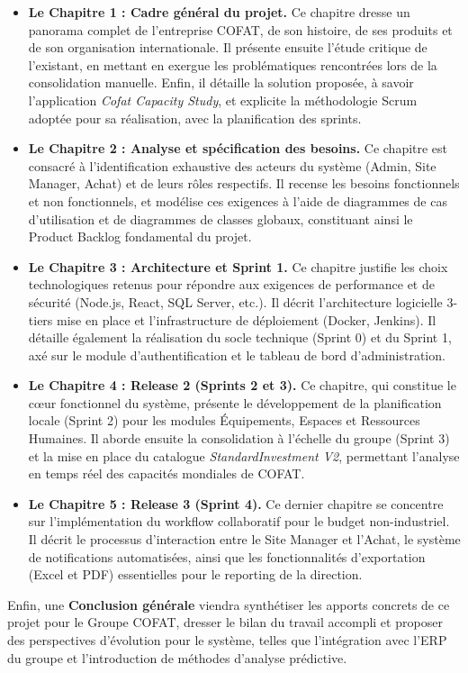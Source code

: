 \begin{itemize}
    \item \textbf{Le Chapitre 1 : Cadre général du projet.} Ce chapitre dresse un panorama complet de l'entreprise COFAT, de son histoire, de ses produits et de son organisation internationale. Il présente ensuite l'étude critique de l'existant, en mettant en exergue les problématiques rencontrées lors de la consolidation manuelle. Enfin, il détaille la solution proposée, à savoir l'application \textit{Cofat Capacity Study}, et explicite la méthodologie Scrum adoptée pour sa réalisation, avec la planification des sprints.
    
    \item \textbf{Le Chapitre 2 : Analyse et spécification des besoins.} Ce chapitre est consacré à l'identification exhaustive des acteurs du système (Admin, Site Manager, Achat) et de leurs rôles respectifs. Il recense les besoins fonctionnels et non fonctionnels, et modélise ces exigences à l'aide de diagrammes de cas d'utilisation et de diagrammes de classes globaux, constituant ainsi le Product Backlog fondamental du projet.
    
    \item \textbf{Le Chapitre 3 : Architecture et Sprint 1.} Ce chapitre justifie les choix technologiques retenus pour répondre aux exigences de performance et de sécurité (Node.js, React, SQL Server, etc.). Il décrit l'architecture logicielle 3-tiers mise en place et l'infrastructure de déploiement (Docker, Jenkins). Il détaille également la réalisation du socle technique (Sprint 0) et du Sprint 1, axé sur le module d'authentification et le tableau de bord d'administration.
    
    \item \textbf{Le Chapitre 4 : Release 2 (Sprints 2 et 3).} Ce chapitre, qui constitue le cœur fonctionnel du système, présente le développement de la planification locale (Sprint 2) pour les modules Équipements, Espaces et Ressources Humaines. Il aborde ensuite la consolidation à l'échelle du groupe (Sprint 3) et la mise en place du catalogue \textit{StandardInvestment V2}, permettant l'analyse en temps réel des capacités mondiales de COFAT.
    
    \item \textbf{Le Chapitre 5 : Release 3 (Sprint 4).} Ce dernier chapitre se concentre sur l'implémentation du workflow collaboratif pour le budget non-industriel. Il décrit le processus d'interaction entre le Site Manager et l'Achat, le système de notifications automatisées, ainsi que les fonctionnalités d'exportation (Excel et PDF) essentielles pour le reporting de la direction.
\end{itemize}

Enfin, une \textbf{Conclusion générale} viendra synthétiser les apports concrets de ce projet pour le Groupe COFAT, dresser le bilan du travail accompli et proposer des perspectives d'évolution pour le système, telles que l'intégration avec l'ERP du groupe et l'introduction de méthodes d'analyse prédictive.
